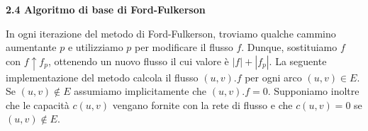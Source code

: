 \documentclass{article}
\begin{document}
\hfill
\begin{flushleft}
\begin{Large} \textbf{2.4 Algoritmo di base di Ford-Fulkerson} \end{Large}
\newline
\newline
In ogni iterazione del metodo di Ford-Fulkerson, troviamo qualche cammino aumentante $p$ e utilizziamo $p$ per modificare il flusso $f$. Dunque, sostituiamo $f$ con $f\uparrow f_p$, ottenendo un nuovo flusso il cui valore è $|f| + |f_p|$. La seguente implementazione del metodo calcola il flusso $(u, v).f$ per ogni arco $(u, v) \in E$. Se $(u, v) \notin E$ assumiamo implicitamente che $(u, v).f = 0$. Supponiamo inoltre che le capacità $c(u, v)$ vengano fornite con la rete di flusso e che $c(u, v) = 0$ se $(u, v) \notin E$.


\end{flushleft}
\end{document}
